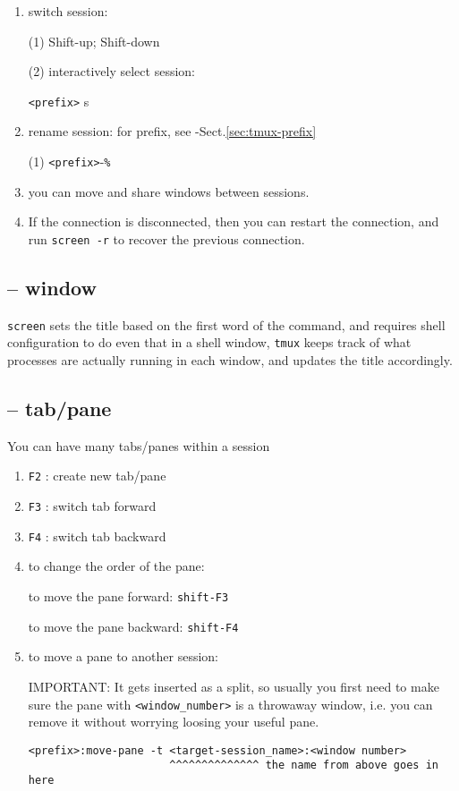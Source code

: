 \begin{enumerate}
  \item  switch session:
  
  (1) Shift-up; Shift-down

  (2)  interactively select session:

  \verb!<prefix>! s
  
  
  \item rename session:  for prefix, see -Sect.\ref{sec:tmux-prefix}
  
  (1) \verb!<prefix>!-\verb!%! 
  
  \item you can move and share windows between sessions.
  
  
  \item If the connection is disconnected, then you can restart the connection,
and run \verb!screen -r! to recover the previous connection.  

\end{enumerate}


\subsection{-- window}
\label{sec:terminal_multiplexer-window}

\verb!screen! sets the title based on the first word of the command, and
requires shell configuration to do even that in a shell window, 
\verb!tmux! keeps track of what processes are actually running in each window,
and updates the title accordingly.


\subsection{-- tab/pane}
\label{sec:terminal_multiplexer-tab}

You can have many tabs/panes within a session
\begin{enumerate}
  \item \verb!F2! : create new tab/pane
  \item \verb!F3! : switch tab forward
  \item \verb!F4! : switch tab backward
  
  \item to change the order of the pane:
  
  to move the pane forward:
  \verb!shift-F3!
  
  to move the pane backward:
  \verb!shift-F4!
    
  \item to move a pane to another session:

IMPORTANT: It gets inserted as a split, so usually you first need to make
sure the pane with \verb!<window_number>! is a throwaway window, i.e. you can
remove it without worrying loosing your useful pane.
\begin{verbatim}
<prefix>:move-pane -t <target-session_name>:<window number>
                      ^^^^^^^^^^^^^^ the name from above goes in here
\end{verbatim}


\end{enumerate}

